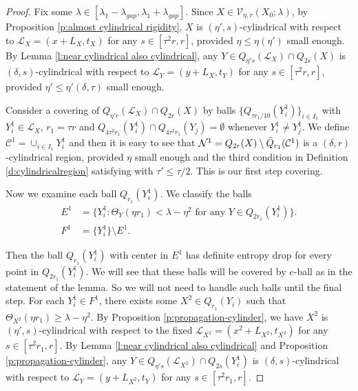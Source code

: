 \documentclass[10pt,a4paper]{amsart}
\newcommand{\cC}{\mathcal{C}}
\newcommand{\cL}{\mathcal{L}}
\newcommand{\cN}{\mathcal{N}}
\newcommand{\cV}{\mathcal{V}}
\begin{document}
\begin{proof}
    Fix some $\lambda \in [\lambda_1 -\lambda_{gap}, \lambda_1 + \lambda_{gap}]$. Since $X \in \cV_{\eta,r}(X_0;\lambda)$, by Proposition \ref{p:almost cylindrical rigidity}, $X$ is $(\eta',s)$-cylindrical with respect to $\cL_{X}= (x+L_X, t_X)$ for any $s \in [\tau^2 r,r]$, provided $\eta\le \eta(\eta')$ small enough. By Lemma \ref{l:near cylindrical also cylindrical}, any $Y \in Q_{\eta' s}(\cL_{X}) \cap Q_{2s}(X)$ is $(\delta, s)$-cylindrical with respect to $\cL_Y = (y+L_X, t_Y)$ for any $s \in [\tau^2 r, r]$, provided $\eta'\le \eta'(\delta,\tau)$ small enough.
    
    Consider a covering of $Q_{\eta' r}(\cL_X) \cap Q_{2r}(X)$ by balls $\{Q_{\tau r_1/10}(Y^1_i)\}_{i \in I_1}$ with $Y^1_i \in \cL_X$, $r_1=\tau r$ and $Q_{4\tau^2 r_1}(Y^1_i) \cap Q_{ 4\tau^2 r_1}(Y_j) = \emptyset$ whenever $Y^1_i \neq Y^1_j$. We define $\cC^1 = \cup_{i\in I_1} Y^1_i$ and then it is easy to see that $\cN^1 = Q_{2r}(X) \setminus \Bar{Q}_{r_1}(\cC^1)$ is a $(\delta,r)$-cylindrical region, provided $\eta$ small enough and the third condition in Definition \ref{d:cylindricalregion} satisfying with $\tau'\le \tau/2$. This is our first step covering. 
    
    Now we examine each ball $Q_{r_1}(Y^1_i)$. We classify the balls 
    \begin{equation*}
    \begin{split}
        E^1 &= \{ Y^1_i : \Theta_Y(\eta r_1) < \lambda - \eta^2 \text{ for any } Y \in Q_{2r_1}(Y^1_i) \}. \\
        F^1 &= \{Y^1_i\} \setminus E^1.
    \end{split}
    \end{equation*}
    
Then the ball $Q_{r_1}(Y_i^1)$ with center in $E^1$ has definite entropy drop for every point in $Q_{2r_1}(Y_i^1)$. We will see that these balls will be covered by $e$-ball as in the statement of the lemma. So we will not need to handle such balls until the final step. 
For each $Y^1_i \in F^1$, there exists some $X^2 \in Q_{r_1}(Y_i)$ such that $\Theta_{X^2}(\eta r_1) \ge \lambda -\eta^2$. By Proposition \ref{p:propagation-cylinder}, we have $X^2$ is $(\eta',s)$-cylindrical with respect to the fixed $\cL_{X^2} = (x^2 + L_{X^2}, t_{X^2})$ for any $s \in [\tau^2 r_1, r]$. By Lemma \ref{l:near cylindrical also cylindrical} and Proposition \ref{p:propagation-cylinder}, any $Y \in Q_{\eta' s}(\cL_{X^2})\cap Q_{2s}(Y^1_i)$ is $(\delta,s)$-cylindrical with respect to $\cL_Y = (y + L_{X^2}, t_Y)$ for any $s\in[\tau^2 r_1, r]$.
    

\end{proof}
\end{document}
